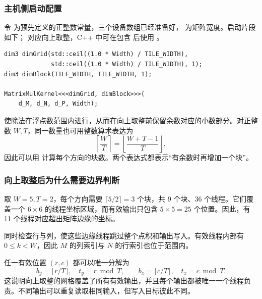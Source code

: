 \subsubsection{主机侧启动配置}
\par\noindent\begin{minipage}{\linewidth}
令  为预先定义的正整数常量，三个设备数组已经准备好， 为矩阵宽度。启动片段如下； 对应向上取整，C++ 中可在包含  后使用 。

\begin{lstlisting}[caption={二维网格与二维线程块的启动片段。}]
dim3 dimGrid(std::ceil((1.0 * Width) / TILE_WIDTH),
             std::ceil((1.0 * Width) / TILE_WIDTH), 1);
dim3 dimBlock(TILE_WIDTH, TILE_WIDTH, 1);

MatrixMulKernel<<<dimGrid, dimBlock>>>(
    d_M, d_N, d_P, Width);
\end{lstlisting}
\end{minipage}\par
{} 使除法在浮点数范围内进行，从而在向上取整前保留余数对应的小数部分。对正整数 $W,T$，同一数量也可用整数算术表达为
\[
\left\lceil\frac WT\right\rceil
=\left\lfloor\frac{W+T-1}{T}\right\rfloor,
\]
因此可以用  计算每个方向的块数。两个表达式都表示“有余数时再增加一个块”。

\subsubsection{向上取整后为什么需要边界判断}
取 $W=5,T=2$，每个方向需要 $\lceil5/2\rceil=3$ 个块，共 9 个块、36 个线程。它们覆盖一个 $6\times6$ 的线程坐标区域，而有效输出只包含 $5\times5=25$ 个位置。因此，有 11 个线程对应超出矩阵边缘的坐标。

 同时检查行与列，使这些边缘线程跳过整个点积和输出写入。有效线程内部有 $0\le k<W$，因此 $M$ 的列索引与 $N$ 的行索引也位于范围内。

任一有效位置 $(r,c)$ 都可以唯一分解为
\[
b_y=\lfloor r/T\rfloor,\quad t_y=r\bmod T,\qquad
b_x=\lfloor c/T\rfloor,\quad t_x=c\bmod T.
\]
这说明向上取整的网格覆盖了所有有效输出，并且每个输出都被唯一一个线程负责。不同输出可以重复读取相同输入，但写入目标彼此不同。
